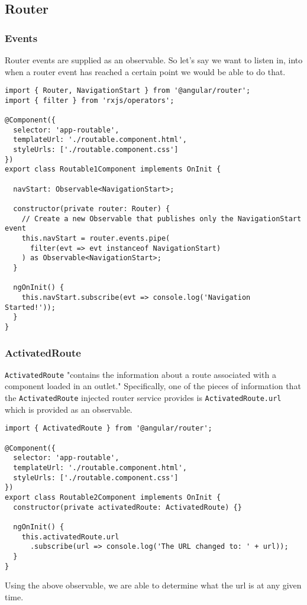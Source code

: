 \subsection{ Router }
\subsubsection{Events}
Router events are supplied as an observable. So let's say we want to listen 
in, into when a router event has reached a certain point we would be able to 
do that. 
\begin{lstlisting}
import { Router, NavigationStart } from '@angular/router';
import { filter } from 'rxjs/operators';

@Component({
  selector: 'app-routable',
  templateUrl: './routable.component.html',
  styleUrls: ['./routable.component.css']
})
export class Routable1Component implements OnInit {

  navStart: Observable<NavigationStart>;

  constructor(private router: Router) {
    // Create a new Observable that publishes only the NavigationStart event
    this.navStart = router.events.pipe(
      filter(evt => evt instanceof NavigationStart)
    ) as Observable<NavigationStart>;
  }

  ngOnInit() {
    this.navStart.subscribe(evt => console.log('Navigation Started!'));
  }
}
\end{lstlisting}

\subsubsection{ ActivatedRoute }
\lstinline{ActivatedRoute} "contains the information about a route associated
with a component loaded in an outlet." Specifically, one of the pieces of 
information that the \lstinline{ActivatedRoute} injected router service 
provides is \lstinline{ActivatedRoute.url} which is provided as an observable. 

\begin{lstlisting}
import { ActivatedRoute } from '@angular/router';

@Component({
  selector: 'app-routable',
  templateUrl: './routable.component.html',
  styleUrls: ['./routable.component.css']
})
export class Routable2Component implements OnInit {
  constructor(private activatedRoute: ActivatedRoute) {}

  ngOnInit() {
    this.activatedRoute.url
      .subscribe(url => console.log('The URL changed to: ' + url));
  }
}
\end{lstlisting}
Using the above observable, we are able to determine what the url is at any
given time. 

